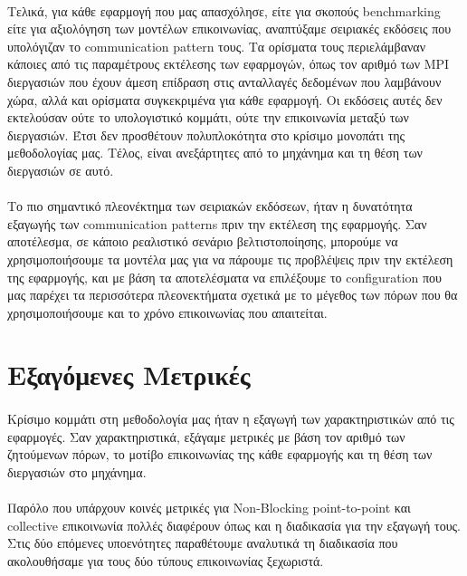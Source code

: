 \paragraph{}
Τελικά, για κάθε εφαρμογή που μας απασχόλησε, είτε για σκοπούς benchmarking είτε για αξιολόγηση των μοντέλων επικοινωνίας, αναπτύξαμε σειριακές εκδόσεις που υπολόγιζαν το communication pattern τους. Τα ορίσματα τους περιελάμβαναν κάποιες από τις παραμέτρους εκτέλεσης των εφαρμογών, όπως τον αριθμό των MPI διεργασιών που έχουν άμεση επίδραση στις ανταλλαγές δεδομένων που λαμβάνουν χώρα, αλλά και ορίσματα συγκεκριμένα για κάθε εφαρμογή. Οι εκδόσεις αυτές δεν εκτελούσαν ούτε το υπολογιστικό κομμάτι, ούτε την επικοινωνία μεταξύ των διεργασιών. Έτσι δεν προσθέτουν πολυπλοκότητα στο κρίσιμο μονοπάτι της μεθοδολογίας μας. Τέλος, είναι ανεξάρτητες από το μηχάνημα και τη θέση των διεργασιών σε αυτό.

\paragraph{}
Το πιο σημαντικό πλεονέκτημα των σειριακών εκδόσεων, ήταν η δυνατότητα εξαγωγής των communication patterns πριν την εκτέλεση της εφαρμογής. Σαν αποτέλεσμα, σε κάποιο ρεαλιστικό σενάριο βελτιστοποίησης, μπορούμε να χρησιμοποιήσουμε τα μοντέλα μας για να πάρουμε τις προβλέψεις πριν την εκτέλεση της εφαρμογής, και με βάση τα αποτελέσματα να επιλέξουμε το configuration που μας παρέχει τα περισσότερα πλεονεκτήματα σχετικά με το μέγεθος των πόρων που θα χρησιμοποιήσουμε και το χρόνο επικοινωνίας που απαιτείται.

\section{Εξαγόμενες Μετρικές}
\paragraph{}
Κρίσιμο κομμάτι στη μεθοδολογία μας ήταν η εξαγωγή των χαρακτηριστικών από τις εφαρμογές. Σαν χαρακτηριστικά, εξάγαμε μετρικές με βάση τον αριθμό των ζητούμενων πόρων, το μοτίβο επικοινωνίας της κάθε εφαρμογής και τη θέση των διεργασιών στο μηχάνημα. 

\paragraph{}
Παρόλο που υπάρχουν κοινές μετρικές για Non-Blocking point-to-point και collective επικοινωνία πολλές διαφέρουν όπως και η διαδικασία για την εξαγωγή τους. Στις δύο επόμενες υποενότητες παραθέτουμε αναλυτικά τη διαδικασία που ακολουθήσαμε για τους δύο τύπους επικοινωνίας ξεχωριστά.
